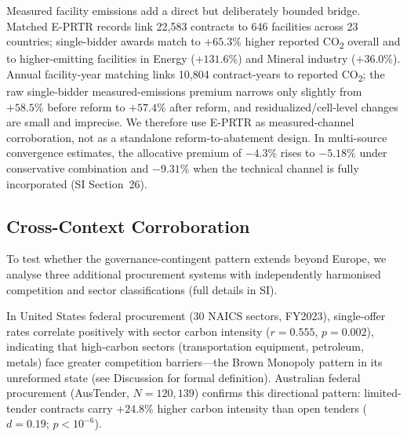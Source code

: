 \documentclass[11pt,a4paper]{article}
\begin{document}
Measured facility emissions add a direct but deliberately bounded bridge. Matched E-PRTR records link 22,583 contracts to 646 facilities across 23 countries; single-bidder awards match to $+65.3\%$ higher reported CO\textsubscript{2} overall and to higher-emitting facilities in Energy ($+131.6\%$) and Mineral industry ($+36.0\%$). Annual facility-year matching links 10,804 contract-years to reported CO\textsubscript{2}; the raw single-bidder measured-emissions premium narrows only slightly from $+58.5\%$ before reform to $+57.4\%$ after reform, and residualized/cell-level changes are small and imprecise. We therefore use E-PRTR as measured-channel corroboration, not as a standalone reform-to-abatement design. In multi-source convergence estimates, the allocative premium of $-4.3\%$ rises to $-5.18\%$ under conservative combination and $-9.31\%$ when the technical channel is fully incorporated (SI Section~26).

\subsection{Cross-Context Corroboration}
\label{sec:crosscontext}

To test whether the governance-contingent pattern extends beyond Europe, we analyse three additional procurement systems with independently harmonised competition and sector classifications (full details in SI).

In United States federal procurement (30 NAICS sectors, FY2023), single-offer rates correlate positively with sector carbon intensity ($r = 0.555$, $p = 0.002$), indicating that high-carbon sectors (transportation equipment, petroleum, metals) face greater competition barriers---the Brown Monopoly pattern in its unreformed state (see Discussion for formal definition)\cite{csis2023defense}. Australian federal procurement (AusTender, $N = 120{,}139$) confirms this directional pattern: limited-tender contracts carry $+24.8\%$ higher carbon intensity than open tenders ($d = 0.19$; $p < 10^{-6}$)\cite{austender2020}.
\end{document}
